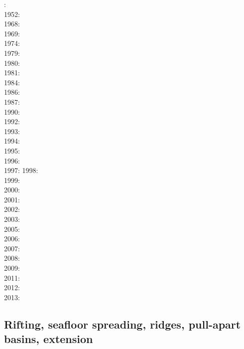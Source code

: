 : \cite{druc51}\cite{hafn51}\\
1952: \cite{drpr52}\\
1968: \cite{byer68}\\
1969: \cite{hand69}\\
1974: \cite{kogo74}\\
1979: \cite{goev79}\cite{evgo79}\\
1980: \cite{brko80}\\
1981: \cite{delo81}\\
1984: \cite{rafi84}\cite{chpa84}\cite{vede84}\\
1986: \cite{kapf86}\\
1987: \cite{kikr87}\\
1990: \cite{wica90}\\
1992: \cite{bako92}\cite{chbo92}\cite{kali92}\cite{kohl92}\\
1993: \cite{kawu93}\\
1994: \cite{fran94}\\
1995: \cite{koem95}\cite{gltu95}\\
1996: \cite{wasd96}\cite{hiko96}\\
1997: \cite{eshe97a,eshe97b}
1998: \cite{copo98}\cite{mazk98}\\
1999: \cite{kayk99}\\
2000: \cite{rydr00}\cite{rana00}\cite{meko00a,meko00b}\\
2001: \cite{lova01}\\
2002: \cite{hirt02}\\
2003: \cite{hiko03}\cite{kaju03}\cite{mohi03}\\
2005: \cite{didr05}\cite{drur05}\\
2006: \cite{rygw06}\cite{buwa06}\\
2007: \cite{hirw07}\cite{kohl07}\cite{faja07}\\
2008: \cite{lemm08}\cite{budr08}\cite{koka08}\cite{gird08}\\
2009: \cite{kayk09}\cite{kako09}\\
2011: \cite{lell11}\cite{kemk11}\\
2012: \cite{reyn12}\\
2013: \cite{lepo13}\cite{miam13}


\subsection*{Rifting, seafloor spreading, ridges, pull-apart basins, extension}

